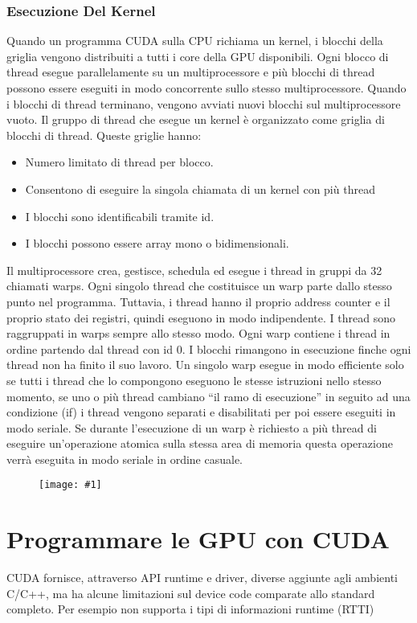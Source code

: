 \documentclass[8pt,a4paper]{article}
\newcommand{\f}[1]{
      \begin{figure}[H]
        \center
      \texttt{[image: \#1]}
      \end{figure}
}
\begin{document}
\begin{multicols}{5}
    \subsubsection{Esecuzione Del Kernel}
    Quando un programma CUDA sulla CPU richiama un kernel, i blocchi della griglia 
    vengono distribuiti a tutti i core della GPU disponibili. Ogni blocco di thread 
    esegue parallelamente su un multiprocessore e più blocchi di thread possono 
    essere eseguiti in modo concorrente sullo stesso multiprocessore. Quando i blocchi 
    di thread terminano, vengono avviati nuovi blocchi sul multiprocessore vuoto. Il 
    gruppo di thread che esegue un kernel è organizzato come griglia di blocchi di 
    thread. Queste griglie hanno:
    \begin{itemize}
      \item Numero limitato di thread per blocco.
      \item Consentono di eseguire la singola chiamata di un kernel con più thread 
      \item I blocchi sono identificabili tramite id.
      \item I blocchi possono essere array mono o bidimensionali.
    \end{itemize}
    Il multiprocessore crea, gestisce, schedula ed esegue i thread in gruppi da 
    32 chiamati warps. Ogni singolo thread che costituisce un warp parte dallo 
    stesso punto nel programma. Tuttavia, i thread hanno il proprio address counter 
    e il proprio stato dei registri, quindi eseguono in modo indipendente. I thread 
    sono raggruppati in warps sempre allo stesso modo. Ogni warp contiene i thread in 
    ordine partendo dal thread con id 0. I blocchi rimangono in esecuzione finche ogni 
    thread non ha finito il suo lavoro. Un singolo warp esegue in modo efficiente solo 
    se tutti i thread che lo compongono eseguono le stesse istruzioni nello stesso 
    momento, se uno o più thread cambiano “il ramo di esecuzione” in seguito ad una 
    condizione (if) i thread vengono separati e disabilitati per poi essere eseguiti 
    in modo seriale. Se durante l’esecuzione di un warp è richiesto a più thread di 
    eseguire un’operazione atomica sulla stessa area di memoria questa operazione 
    verrà eseguita in modo seriale in ordine casuale.
    \f{kernel-exec}

    \section{Programmare le GPU con CUDA}
    CUDA fornisce, attraverso API runtime e driver, diverse aggiunte agli ambienti C/C++, ma ha alcune 
    limitazioni sul device code comparate allo standard completo. Per esempio non supporta i tipi di 
    informazioni runtime (RTTI)
    

\end{multicols}
\end{document}
